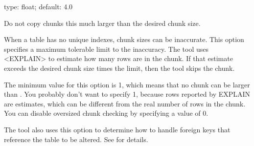 \documentclass[letterpaper,10pt,english]{sphinxmanual}
\begin{document}
\begin{fulllineitems}
\label{\detokenize{mariadb-schema-change:cmdoption-mariadb-schema-change-chunk-size-limit}}
type: float; default: 4.0

Do not copy chunks this much larger than the desired chunk size.

When a table has no unique indexes, chunk sizes can be inaccurate.  This option
specifies a maximum tolerable limit to the inaccuracy.  The tool uses \textless{}EXPLAIN\textgreater{}
to estimate how many rows are in the chunk.  If that estimate exceeds the
desired chunk size times the limit, then the tool skips the chunk.

The minimum value for this option is 1, which means that no chunk can be larger
than {\hyperref[\detokenize{mariadb-schema-change:cmdoption-mariadb-schema-change-chunk-size}]{}}.  You probably don’t want to specify 1, because rows
reported by EXPLAIN are estimates, which can be different from the real number
of rows in the chunk.  You can disable oversized chunk checking by specifying a
value of 0.

The tool also uses this option to determine how to handle foreign keys that
reference the table to be altered. See {\hyperref[\detokenize{mariadb-schema-change:cmdoption-mariadb-schema-change-alter-foreign-keys-method}]{}} for
details.

\end{fulllineitems}

\end{document}
